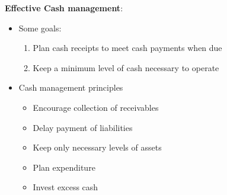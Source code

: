 \documentclass{article}
\begin{document}
\begin{multicols}{2}
\textbf{Effective Cash management}:
\begin{itemize}
	\item Some goals:
	\begin{enumerate}
		\item Plan cash receipts to meet cash payments when due
		\item Keep a minimum level of cash necessary to operate
	\end{enumerate}
    \item Cash management principles
    \begin{itemize}
    	\item Encourage collection of receivables
    	\item Delay payment of liabilities
    	\item Keep only necessary levels of assets
    	\item Plan expenditure
    	\item Invest excess cash
    \end{itemize}
\end{itemize}


\end{multicols}
\end{document}
